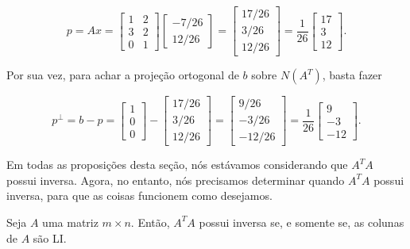 \begin{Example}
	$$
	p = Ax = \begin{bmatrix}
		1 & 2 \\
		3 & 2 \\
		0 & 1
	\end{bmatrix}\begin{bmatrix}
		-7/26 \\
		12/26
	\end{bmatrix} = \begin{bmatrix}
		17/26 \\
		3/26 \\
		12/26
	\end{bmatrix} = \dfrac{1}{26}\begin{bmatrix}
		17 \\
		3 \\
		12
	\end{bmatrix}.
	$$
	
	Por sua vez, para achar a projeção ortogonal de $b$ sobre $N(A^T)$, basta fazer 
	
	$$
	p^\perp = b - p = \begin{bmatrix}
		1 \\
		0 \\
		0
	\end{bmatrix} - \begin{bmatrix}
		17/26 \\
		3/26 \\
		12/26
	\end{bmatrix} = \begin{bmatrix}
		9/26 \\
		-3/26 \\
		-12/26
	\end{bmatrix} = \dfrac{1}{26}\begin{bmatrix}
		9 \\
		-3 \\
		-12
	\end{bmatrix}.
	$$
\end{Example}

Em todas as proposições desta seção, nós estávamos considerando que $A^TA$ possui inversa. Agora, no entanto, nós precisamos determinar quando $A^TA$ possui inversa, para que as coisas funcionem como desejamos.

\begin{Theorem}
	Seja $A$ uma matriz $m\times n$. Então, $A^TA$ possui inversa se, e somente se, as colunas de $A$ são LI.
\end{Theorem}

